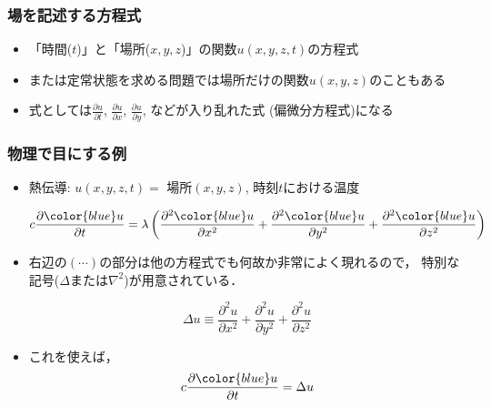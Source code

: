 \documentclass[12pt,dvipdfmx]{beamer}
\newcommand{\ao}[1]{{\color{blue}#1}}
\begin{document}
\begin{frame}
\frametitle{場を記述する方程式}
\begin{itemize}
\item 「時間($t$)」と「場所($x, y, z$)」の関数$u(x, y, z, t)$の方程式
\item または定常状態を求める問題では場所だけの関数$u(x, y, z)$のこともある
\item 式としては$\frac{\partial u}{\partial t}$,
$\frac{\partial u}{\partial x}$,
$\frac{\partial u}{\partial y}$, などが入り乱れた式
(\ao{偏微分方程式})になる
\end{itemize}
\end{frame}


\begin{frame}
\frametitle{物理で目にする例}
\begin{itemize}
\item 熱伝導: $u(x, y, z, t) =$ 場所$(x,y,z)$, 時刻$t$における温度

\[ c\frac{\partial \ao{u}}{\partial t}
= \lambda \left(\frac{\partial^2 \ao{u}}{\partial x^2}
+ \frac{\partial^2 \ao{u}}{\partial y^2}
+ \frac{\partial^2 \ao{u}}{\partial z^2}\right)
\]
\item 右辺の$(\cdots)$の部分は他の方程式でも何故か非常によく現れるので，
特別な記号($\Delta$または$\nabla^2$)が用意されている．

\[ \Delta u \equiv \frac{\partial^2 u}{\partial x^2}
+ \frac{\partial^2 u}{\partial y^2}
+ \frac{\partial^2 u}{\partial z^2}
\]

\item これを使えば，
\[ c\frac{\partial \ao{u}}{\partial t} = \Delta u \]
\end{itemize}


\end{frame}
\end{document}
